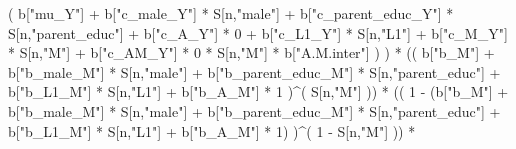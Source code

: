 \documentclass[
]{book}
\newenvironment{Shaded}{\begin{snugshade}}{\end{snugshade}}
\newcommand{\DecValTok}[1]{\textcolor[rgb]{0.00,0.00,0.81}{#1}}
\newcommand{\NormalTok}[1]{#1}
\newcommand{\SpecialCharTok}[1]{\textcolor[rgb]{0.00,0.00,0.00}{#1}}
\newcommand{\StringTok}[1]{\textcolor[rgb]{0.31,0.60,0.02}{#1}}
\begin{document}
\begin{Shaded}
\begin{Highlighting}[]
\NormalTok{                           ( b[}\StringTok{"mu\_Y"}\NormalTok{] }\SpecialCharTok{+} 
\NormalTok{                               b[}\StringTok{"c\_male\_Y"}\NormalTok{] }\SpecialCharTok{*}\NormalTok{ S[n,}\StringTok{"male"}\NormalTok{] }\SpecialCharTok{+} 
\NormalTok{                               b[}\StringTok{"c\_parent\_educ\_Y"}\NormalTok{] }\SpecialCharTok{*}\NormalTok{ S[n,}\StringTok{"parent\_educ"}\NormalTok{] }\SpecialCharTok{+} 
\NormalTok{                               b[}\StringTok{"c\_A\_Y"}\NormalTok{] }\SpecialCharTok{*} \DecValTok{0} \SpecialCharTok{+} 
\NormalTok{                               b[}\StringTok{"c\_L1\_Y"}\NormalTok{] }\SpecialCharTok{*}\NormalTok{ S[n,}\StringTok{"L1"}\NormalTok{] }\SpecialCharTok{+}
\NormalTok{                               b[}\StringTok{"c\_M\_Y"}\NormalTok{] }\SpecialCharTok{*}\NormalTok{ S[n,}\StringTok{"M"}\NormalTok{] }\SpecialCharTok{+} 
\NormalTok{                               b[}\StringTok{"c\_AM\_Y"}\NormalTok{] }\SpecialCharTok{*} \DecValTok{0} \SpecialCharTok{*}\NormalTok{ S[n,}\StringTok{"M"}\NormalTok{] }\SpecialCharTok{*}\NormalTok{ b[}\StringTok{"A.M.inter"}\NormalTok{] ) ) }\SpecialCharTok{*}
\NormalTok{      (( b[}\StringTok{"b\_M"}\NormalTok{] }\SpecialCharTok{+} 
\NormalTok{           b[}\StringTok{"b\_male\_M"}\NormalTok{] }\SpecialCharTok{*}\NormalTok{ S[n,}\StringTok{"male"}\NormalTok{] }\SpecialCharTok{+} 
\NormalTok{           b[}\StringTok{"b\_parent\_educ\_M"}\NormalTok{] }\SpecialCharTok{*}\NormalTok{ S[n,}\StringTok{"parent\_educ"}\NormalTok{] }\SpecialCharTok{+}
\NormalTok{           b[}\StringTok{"b\_L1\_M"}\NormalTok{] }\SpecialCharTok{*}\NormalTok{ S[n,}\StringTok{"L1"}\NormalTok{] }\SpecialCharTok{+}
\NormalTok{           b[}\StringTok{"b\_A\_M"}\NormalTok{] }\SpecialCharTok{*} \DecValTok{1}\NormalTok{ )}\SpecialCharTok{\^{}}\NormalTok{( S[n,}\StringTok{"M"}\NormalTok{] )) }\SpecialCharTok{*} 
\NormalTok{      (( }\DecValTok{1} \SpecialCharTok{{-}}\NormalTok{ (b[}\StringTok{"b\_M"}\NormalTok{] }\SpecialCharTok{+} 
\NormalTok{                b[}\StringTok{"b\_male\_M"}\NormalTok{] }\SpecialCharTok{*}\NormalTok{ S[n,}\StringTok{"male"}\NormalTok{] }\SpecialCharTok{+} 
\NormalTok{                b[}\StringTok{"b\_parent\_educ\_M"}\NormalTok{] }\SpecialCharTok{*}\NormalTok{ S[n,}\StringTok{"parent\_educ"}\NormalTok{] }\SpecialCharTok{+} 
\NormalTok{                b[}\StringTok{"b\_L1\_M"}\NormalTok{] }\SpecialCharTok{*}\NormalTok{ S[n,}\StringTok{"L1"}\NormalTok{] }\SpecialCharTok{+}
\NormalTok{                b[}\StringTok{"b\_A\_M"}\NormalTok{] }\SpecialCharTok{*} \DecValTok{1}\NormalTok{) )}\SpecialCharTok{\^{}}\NormalTok{( }\DecValTok{1} \SpecialCharTok{{-}}\NormalTok{ S[n,}\StringTok{"M"}\NormalTok{] ))  }\SpecialCharTok{*}

\end{Highlighting}
\end{Shaded}
\end{document}
